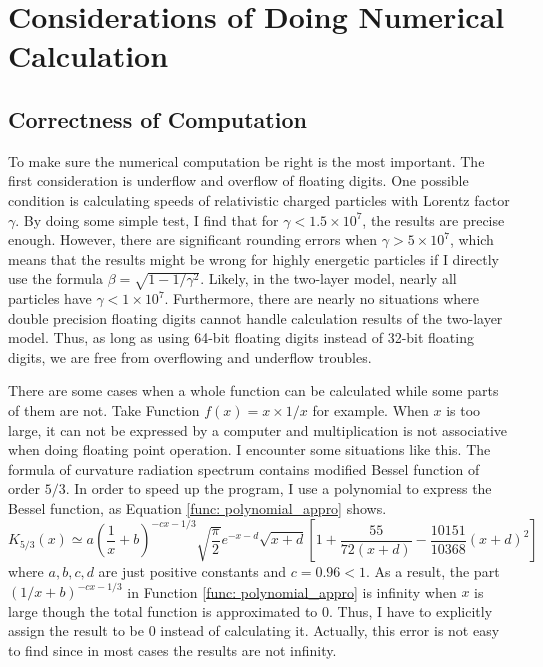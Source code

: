 \documentclass[12pt]{report}
\begin{document}
  

  \section{Considerations of Doing Numerical Calculation}
    \subsection{Correctness of Computation}
      To make sure the numerical computation be right is the most important. 
      The first consideration is underflow and overflow of floating digits.
      One possible condition is calculating speeds of relativistic charged particles with 
      Lorentz factor $\gamma$. By doing some simple test, I find that for 
      $\gamma < 1.5\times 10^7$, the results are precise enough. However, there are 
      significant rounding errors when $\gamma > 5\times 10^7$, which means that the 
      results might be wrong for highly energetic particles if I directly use the formula 
      $\beta = \sqrt{1 - 1/\gamma^2}$.
      Likely, in the two-layer model, nearly all particles have $\gamma < 1\times 10^7$. 
      Furthermore, there are nearly no situations where double precision floating digits
      cannot handle calculation results of the two-layer model. Thus, as long as using 
      64-bit floating digits instead of 32-bit floating digits, we are free from overflowing 
      and underflow troubles. 
        
      There are some cases when a whole function can be calculated while some parts of them 
      are not. Take Function $f\left(x\right) = x\times1/x$ for example. When $x$ is too 
      large, it can not be expressed by a computer and multiplication is not associative when 
      doing floating point operation. I encounter some situations like this.
      The formula of curvature radiation spectrum contains modified Bessel function of order 
      $5/3$. In order to speed up the program, I use a polynomial to express the Bessel 
      function, as Equation \ref{func: polynomial_appro} shows. 
      \begin{equation}
        K_{5/3} \left(x\right) \simeq a \left(\frac{1}{x} + b\right)^{-cx - 1/3} \sqrt{\frac{\pi}{2}} e^{-x - d} \sqrt{x + d} %
        \left[1 + \frac{55}{72\left(x + d\right)} - \frac{10151}{10368}\left(x+d\right)^2\right] 
        \label{func: polynomial_appro}
      \end{equation}
      where $a,b,c,d$ are just positive constants and $c = 0.96 < 1$. As a result, 
      the part $(1/x + b)^{-cx - 1/3}$ in Function \ref{func: polynomial_appro} is infinity
      when $x$ is large though the total function is approximated to $0$. Thus, I have to 
      explicitly assign the result to be $0$ instead of calculating it. Actually, this error 
      is not easy to find since in most cases the results are not infinity. 
          
\end{document}
